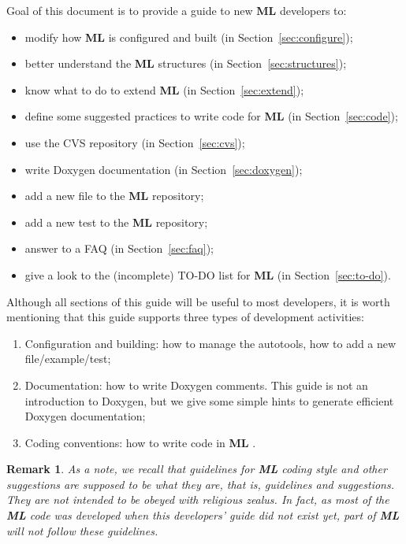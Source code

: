 \documentclass[10pt,letter,relax]{SANDreport}
\newtheorem{remark}{Remark}
\newcommand{\ML}     {{\bf ML }}
\begin{document}
Goal of this document is to provide a guide to new \ML
developers to:
\begin{itemize}
\setlength{\itemsep}{-2pt}
\item modify how \ML is configured and built (in Section~\ref{sec:configure});
\item better understand the \ML structures (in Section~\ref{sec:structures});
\item know what to do to extend \ML (in Section~\ref{sec:extend});
\item define some suggested practices to write code for \ML (in Section~\ref{sec:code});
\item use the CVS repository (in Section~\ref{sec:cvs});
\item write Doxygen documentation (in Section~\ref{sec:doxygen});
\item add a new file to the \ML repository;
\item add a new test to the \ML repository;
\item answer to a FAQ (in Section~\ref{sec:faq});
\item give a look to the (incomplete) TO-DO list for \ML (in
  Section~\ref{sec:to-do}).
\end{itemize}

Although all sections of this guide will be useful to most developers,
it is worth mentioning that this guide supports three types of
development activities:
\begin{enumerate}
\item Configuration and building: how to manage the autotools, how to
  add a new file/example/test;
\item Documentation: how to write Doxygen comments. This guide is not an
  introduction to Doxygen, but we give some simple hints to generate
  efficient Doxygen documentation;
\item Coding conventions: how to write code in \ML.
\end{enumerate}

\begin{remark}
  As a note, we recall that guidelines for \ML coding style and other
  suggestions are supposed to be what they are, that is, guidelines and
  suggestions. They are not intended to be obeyed with religious zealus.
  In fact, as most of the \ML code was developed when this developers'
  guide did not exist yet, part of \ML will not follow these guidelines.
\end{remark}


\end{document}
